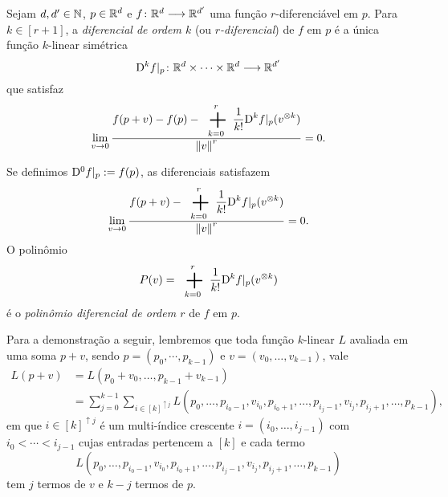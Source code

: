 \begin{definition}[Multidiferencial]
Sejam $d,d' \in \mathbb{N}$, $p \in \mathbb{R}^d$ e ${f}\colon {\mathbb{R}^d} \longrightarrow {\mathbb{R}^{d'}}$ uma função $r$-diferenciável em $p$. Para $k \in [r+1]$, a \emph{diferencial de ordem $k$} (ou \emph{$r$-diferencial}) de $f$ em $p$ é a única função $k$-linear simétrica
	\begin{equation*}
	{\mathrm{D}^k f|_p}\colon {\mathbb{R}^d \times \cdots \times \mathbb{R}^d} \longrightarrow {\mathbb{R}^{d'}}
	\end{equation*}
que satisfaz
	\begin{equation*}
	\lim_{v \conv 0} \frac{\displaystyle f(p+v) - f(p) - \sum_{k=0}^r \frac{1}{k!}\D^k f|_p(v^{\otimes k})}{\nor{v}^r} = 0.
	\end{equation*}

Se definimos $\mathrm{D}^0 f|_p := f(p)$, as diferenciais satisfazem
	\begin{equation*}
	\lim_{v \conv 0} \frac{\displaystyle f(p+v) - \sum_{k=0}^r \frac{1}{k!}\D^k f|_p (v^{\otimes k})}{\nor{v}^r} = 0.
	\end{equation*}
O polinômio
	\begin{equation*}
	P(v) = \sum_{k=0}^r \frac{1}{k!}\D^k f|_p (v^{\otimes k})
	\end{equation*}
é o \emph{polinômio diferencial de ordem $r$} de $f$ em $p$.
\end{definition}


\begin{comment}

\begin{exercise}[Regra da cadeia iterada]
Sejam $d,d',d'' \in \N$, $p \in \R^d$, $\fun{f}{\R^d}{\R^{d'}}$ $2$-diferenciável em $p$ e $\fun{f'}{\R^{d'}}{\R^{d''}}$ diferenciável em $f(p)$. Então $\fun{f' \circ f}{\R^d}{\R^{d''}}$ é diferenciável em $p$ e
	\begin{equation*}
	\D^2 (f' \circ f)(p,p) = \D^2 f'(f(p),f(p)) \circ \D f(p) + \D f'(f(p)) \circ \D^2 f(p)
	\end{equation*}
	\begin{equation*}
	\D^2 \left. (f' \circ f)\right|_{(p,p)} = \D^2 f'|_{(f(p),f(p))} \circ \D f|_p + \D f'|_{f(p)} \circ \D^2 f|_p.
	\end{equation*}
\end{exercise}

\end{comment}

Para a demonstração a seguir, lembremos que toda função $k$-linear $L$ avaliada em uma soma $p+v$, sendo $p=(p_0,\cdots,p_{k-1})$ e $v=(v_0,\ldots,v_{k-1})$, vale
	\begin{align*}
	L(p+v) &= L(p_0+v_0,\ldots,p_{k-1}+v_{k-1}) \\
			&= \sum_{j=0}^{k-1} \sum_{i \in [k]^{\uparrow j}} L(p_0,\ldots,p_{i_0-1},v_{i_0},p_{i_0+1},\ldots,p_{i_j-1},v_{i_j},p_{i_j+1},\ldots,p_{k-1}),
	\end{align*}
em que $i \in [k]^{\uparrow j}$ é um multi-índice crescente $i=(i_0,\ldots,i_{j-1})$ com $i_0 < \cdots < i_{j-1}$ cujas entradas pertencem a $[k]$ e cada termo
	\begin{equation*}
	L(p_0,\ldots,p_{i_0-1},v_{i_0},p_{i_0+1},\ldots,p_{i_j-1},v_{i_j},p_{i_j+1},\ldots,p_{k-1})
	\end{equation*}
tem $j$ termos de $v$ e $k-j$ termos de $p$.

